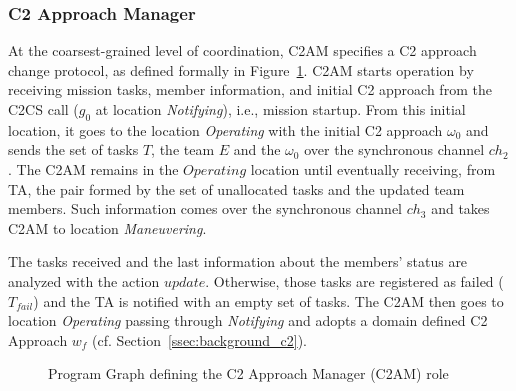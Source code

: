 



\subsubsection{C2 Approach Manager}

At the coarsest-grained level of coordination, C2AM specifies a C2 approach change protocol, as defined formally in Figure~\ref{fig:c2a_pg}. C2AM starts operation by receiving mission tasks, member information, and initial C2 approach from the C2CS call ($g_0$ at location \textit{Notifying}), i.e., mission startup. From this initial location, it goes to the location \textit{Operating} with the initial C2 approach $\omega_0$ and sends the set of tasks $T$, the team $E$ and the $\omega_0$ over the synchronous channel $ch_2$. The C2AM remains in the $Operating$ location until eventually receiving, from TA, the pair formed by the set of unallocated tasks and the updated team members. Such information comes over the synchronous channel $ch_3$ and takes C2AM to location \textit{Maneuvering}.

The tasks received and the last information about the members' status are analyzed with the action $update$.  Otherwise, those tasks are registered as failed ($T_{fail}$) and the TA is notified with an empty set of tasks. The C2AM then goes to location \emph{Operating} passing through \emph{Notifying} and adopts a domain defined C2 Approach $w_f$ (cf. Section~\ref{ssec:background_c2}). 

\begin{figure}[!ht]
    \centering
    \scalebox{.65}{}
    \caption{Program Graph defining the C2 Approach Manager (C2AM) role}
    \label{fig:c2a_pg}
\end{figure}

